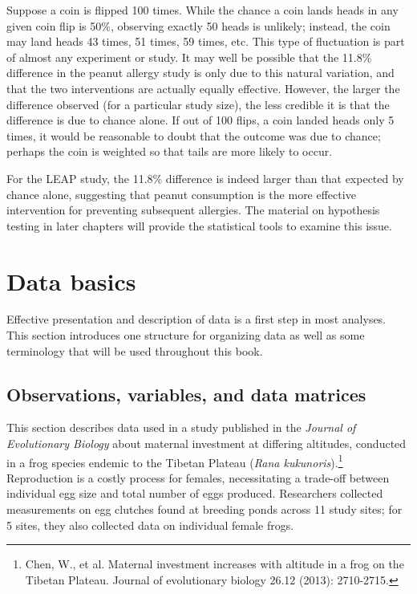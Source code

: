 \begin{doublespace}
Suppose a coin is flipped 100 times. While the chance a coin lands heads in any given coin flip is 50\%, observing exactly 50 heads is unlikely; instead, the coin may land heads 43 times, 51 times, 59 times, etc. This type of fluctuation is part of almost any experiment or study. It may well be possible that the 11.8\% difference in the peanut allergy study is only due to this natural variation, and that the two interventions are actually equally effective. However, the larger the difference observed (for a particular study size), the less credible it is that the difference is due to chance alone. If out of 100 flips, a coin landed heads only 5 times, it would be reasonable to doubt that the outcome was due to chance; perhaps the coin is weighted so that tails are more likely to occur.

For the LEAP study, the 11.8\% difference is indeed larger than that expected by chance alone, suggesting that peanut consumption is the more effective intervention for preventing subsequent allergies. The material on hypothesis testing in later chapters will provide the statistical tools to examine this issue.



\section{Data basics}
\label{dataBasics}

Effective presentation and description of data is a first step in most analyses. This section introduces one structure for organizing data as well as some terminology that will be used throughout this book.


\subsection{Observations, variables, and data matrices}
\label{frogDataExample}

This section describes data used in a study published in the \textit{Journal of Evolutionary Biology} about maternal investment at differing altitudes, conducted in a frog species endemic to the Tibetan Plateau (\textit{Rana kukunoris}).\footnote{ Chen, W., et al. Maternal investment increases with altitude in a frog on the Tibetan Plateau. Journal of evolutionary biology 26.12 (2013): 2710-2715.} Reproduction is a costly process for females, necessitating a trade-off between individual egg size and total number of eggs produced. Researchers collected measurements on egg clutches found at breeding ponds across 11 study sites; for 5 sites, they also collected data on individual female frogs.


\end{doublespace}
